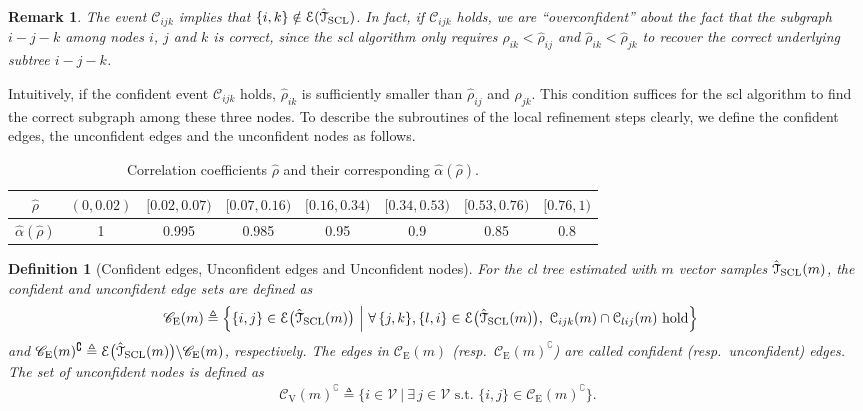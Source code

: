 \documentclass[11pt,onecolumn]{article}
\newcommand{\calC}{\mathcal{C}}
\newcommand{\calE}{\mathcal{E}}
\newcommand{\calT}{\mathcal{T}}
\newcommand{\calV}{\mathcal{V}}
\newcommand{\hatcalT}{\hat{\calT}}
\newcommand{\scC}{\mathscr{C}}
\newcommand{\halpha}{\hat{\alpha}}
\newcommand{\hrho}{\hat{\rho}}
\newtheorem{definition}{Definition}
\newtheorem{remark}{Remark}
\begin{document}
\begin{remark}
	The event $\calC_{ijk}$ implies that $\{i,k\}\notin\calE(\hatcalT_{\rm{SCL}})$. In fact, if $\calC_{ijk}$ holds, we are ``overconfident'' about the fact  that the subgraph $i-j-k$ among nodes $i$, $j$ and $k$ is correct, since the \ac{scl} algorithm only requires $\hrho_{ik}< \hrho_{ij}$ and $\hrho_{ik}< \hrho_{jk}$ to recover the correct underlying subtree $i-j-k$.
\end{remark}
Intuitively, if the confident event $\calC_{ijk}$ holds, $\hrho_{ik}$ is sufficiently smaller than $\hrho_{ij}$ and $\hrho_{jk}$. This condition suffices  for the \ac{scl} algorithm to find the correct subgraph among these three nodes. To describe the subroutines of the local refinement steps clearly, we define the confident edges, the unconfident edges and the unconfident nodes as follows.
\begin{table}[H]
	\normalsize
	\centering
	\begin{tabular}{|c|c|c|c|c|c|c|c|}
	\hline
	$\hrho$ & $(0,0.02)$ & $[0.02,0.07)$ & $[0.07,0.16)$ & $[0.16,0.34)$ & $[0.34,0.53)$ & $[0.53,0.76)$ & $[0.76,1)$\\
	\hline
	$\halpha(\hrho)$ & 1 & 0.995 & 0.985 & 0.95 & 0.9 & 0.85 & 0.8 \\
	\hline
	\end{tabular}
	\caption{Correlation coefficients $\hrho$ and their corresponding $\halpha(\hrho)$.}
	\label{table:alpha}
\end{table}
\begin{definition}[Confident edges, Unconfident edges and Unconfident nodes]\label{def:confide}
	For the \ac{cl} tree estimated with $m$ vector samples $\hatcalT_{\rm{SCL}}(m)$, the confident and unconfident edge sets are defined as
	\begin{align}
		\scC_{\mathrm{E}}(m)&\triangleq \Big\{\{i,j\}\in\calE\big(\hatcalT_{\rm{SCL}}(m)\big) ~\Big|~\forall\, \{j,k\},\{l,i\}\in\calE\big(\hatcalT_{\rm{SCL}}(m)\big),~\calC_{ijk}(m) \cap\calC_{lij}(m) \text{ hold}\Big\}
		\end{align}
		and $\scC_{\mathrm{E}}(m)^{\complement} \triangleq \calE\big(\hatcalT_{\rm{SCL}}(m)\big)\backslash \scC_{\mathrm{E}}(m)$,
	respectively. The edges in $\scC_{\mathrm{E}}(m)$ (resp.\ $\scC_{\mathrm{E}}(m)^{\complement}$) are called confident (resp.\ unconfident) edges. The set of unconfident nodes  is defined as
	\begin{align}
		\scC_{\mathrm{V}}(m)^{\complement}\triangleq \big\{i\in\calV \ \big| \ \exists\,  j\in\calV \text{ s.t. }\{i,j\}\in \scC_{\mathrm{E}}(m)^{\complement} \big\}.\nonumber
	\end{align}
\end{definition}
\end{document}
